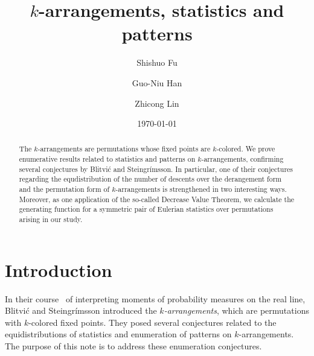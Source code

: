 \documentclass[12pt]{amsart}
\numberwithin{equation}{section}
\theoremstyle{plain}
\theoremstyle{definition}
\begin{document}
\title[$k$-arrangements]{ $k$-arrangements, statistics and  patterns}


\author[S. Fu]{Shishuo Fu}
\address[Shishuo Fu]{College of Mathematics and Statistics, Chongqing University, Huxi campus, Chongqing 401331, P.R. China}

\author[G.-N. Han]{Guo-Niu Han}
\address[Guo-Niu Han]{I.R.M.A., UMR 7501, Universit\'e de Strasbourg et CNRS, 7 rue Ren\'e Descartes, F-67084 Strasbourg, France}

\author[Z. Lin]{Zhicong Lin}
\address[Zhicong Lin]{Research Center for Mathematics and Interdisciplinary Sciences, Shandong University, Qingdao 266237, P.R. China}
\date{\today}

\begin{abstract} The $k$-arrangements  are permutations whose fixed points are $k$-colored. We prove enumerative results related to statistics and patterns on $k$-arrangements, confirming  several conjectures by Blitvi\'c and Steingr\'imsson.  In particular, one of their conjectures regarding the equdistribution of the number of descents over the derangement form and the permutation form of $k$-arrangements is strengthened in two interesting ways. Moreover, as one application of the so-called Decrease Value Theorem, we calculate the generating function for a symmetric pair of Eulerian statistics over permutations arising in our study. 
\end{abstract}


\maketitle




\section{Introduction}\label{sec:intro} 

In their course~\cite{bs} of interpreting moments of probability measures on the real line, Blitvi\'c and Steingr\'imsson introduced the {\em$k$-arrangements}, which are permutations with $k$-colored fixed points. They posed several  conjectures related to the equidistributions of statistics and enumeration of patterns on $k$-arrangements. The purpose of this note is to address these enumeration conjectures.
\end{document}
